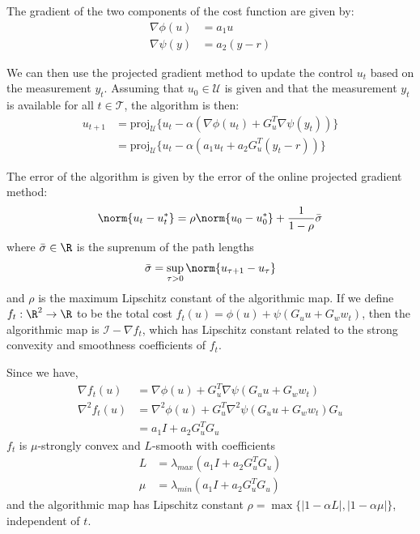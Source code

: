\documentclass{homework}
\begin{document}
The gradient of the two components of the cost function are given by:
\begin{align*}
    \nabla \phi(u) &= a_1 u \\
    \nabla \psi(y) &= a_2 (y - r)
\end{align*}

We can then use the projected gradient method to update the control $u_{t}$
based on the measurement $y_t$. Assuming that $u_0\in\mathcal{U}$ is given
and that the measurement $y_t$ is available for all $t \in \mathcal{T}$,
the algorithm is then:
\begin{align*}
    u_{t+1} &=
        \text{proj}_{\mathcal{U}} \biggl\{u_t - \alpha
        (\nabla \phi(u_t) + G_u^T \nabla \psi(y_t)) \biggr\} \\
        &= \text{proj}_{\mathcal{U}} \biggl\{u_t - \alpha
        (a_1 u_t + a_2 G_u^T (y_t - r)) \biggr\}
\end{align*}

The error of the algorithm is given by the error of the online projected
gradient method:
\begin{equation*}
    \norm{u_t - u_t^*} = \rho \norm{u_0 - u_0^*} + \frac{1}{1 - \rho} \bar{\sigma}
\end{equation*}
where $\bar{\sigma} \in \R$ is the suprenum of the path lengths
\begin{equation*}
    \bar{\sigma} = \sup_{\tau > 0} \norm{u_{\tau + 1} - u_\tau}
\end{equation*}
and $\rho$ is the maximum Lipschitz constant of the algorithmic map. If we define
$f_t: \R^2 \to \R$ to be the total cost $f_t(u) = \phi(u) + \psi(G_u u + G_w w_t)$,
then the algorithmic map is $\mathcal{I} - \nabla f_t$, which has Lipschitz
constant related to the strong convexity and smoothness coefficients of $f_t$.

Since we have,
\begin{align*}
    \nabla f_t(u) &= \nabla \phi(u) + G_u^T \nabla \psi ( G_u u + G_w w_t) \\
    \nabla^2 f_t(u) &= \nabla^2 \phi(u) + G_u^T \nabla^2 \psi ( G_u u + G_w w_t) G_u \\
        &= a_1 I + a_2 G_u^T G_u
\end{align*}
$f_t$ is $\mu$-strongly convex and $L$-smooth with coefficients
\begin{align*}
    L &= \lambda_{max}(a_1 I + a_2 G_u^T G_u) \\
    \mu &= \lambda_{min} (a_1 I + a_2 G_u^T G_u)
\end{align*}
and the algorithmic map has Lipschitz constant
$\rho = \max\{|1 - \alpha L|, |1 - \alpha \mu|\}$, independent of $t$.
\end{document}

